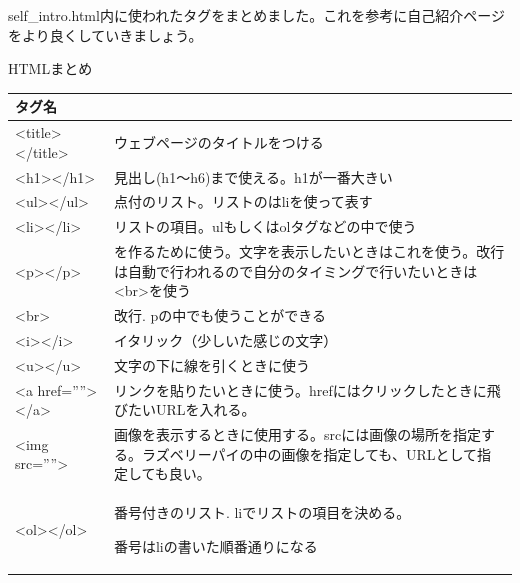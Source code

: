 \documentclass[a4paper,12pt,dvipdfmx]{jarticle}
\begin{document}
self\_intro.html内に使われたタグをまとめました。これを参考に自己紹介ページをより良くしていきましょう。

\clearpage
HTMLまとめ\ \

\begin{center}
	\tablefirsthead{}
	\tablehead{}
	\tabletail{}
	\tablelasttail{}
	\begin{supertabular}{|m{4.0cm}|m{12.0cm}|}
		\hline
		タグ名 &

		\\\hline

		{\textless}title{\textgreater}{\textless}/title{\textgreater} &
		ウェブページのタイトルをつける\\\hline
		{\textless}h1{\textgreater}{\textless}/h1{\textgreater} &
		見出し(h1～h6)まで使える。h1が一番大きい\\\hline
		{\textless}ul{\textgreater}{\textless}/ul{\textgreater} &

		点付のリスト。リストのはliを使って表す\\\hline
		{\textless}li{\textgreater}{\textless}/li{\textgreater} &
		リストの項目。ulもしくはolタグなどの中で使う\\\hline
		{\textless}p{\textgreater}{\textless}/p{\textgreater} &
		を作るために使う。文字を表示したいときはこれを使う。改行は自動で行われるので自分のタイミングで行いたいときは{\textless}br{\textgreater}を使う\\\hline
		{\textless}br{\textgreater} &
		改行. pの中でも使うことができる\\\hline
		{\textless}i{\textgreater}{\textless}/i{\textgreater} &
		イタリック（少しいた感じの文字）\\\hline
		{\textless}u{\textgreater}{\textless}/u{\textgreater} &
		文字の下に線を引くときに使う\\\hline
		{\textless}a href=””{\textgreater}{\textless}/a{\textgreater} &
		リンクを貼りたいときに使う。hrefにはクリックしたときに飛びたいURLを入れる。\\\hline
		{\textless}img src=””{\textgreater} &
		画像を表示するときに使用する。srcには画像の場所を指定する。ラズベリーパイの中の画像を指定しても、URLとして指定しても良い。\\\hline
		{\textless}ol{\textgreater}{\textless}/ol{\textgreater} &
		番号付きのリスト.
		liでリストの項目を決める。

		番号はliの書いた順番通りになる\\\hline
	\end{supertabular}
\end{center}
\end{document}
